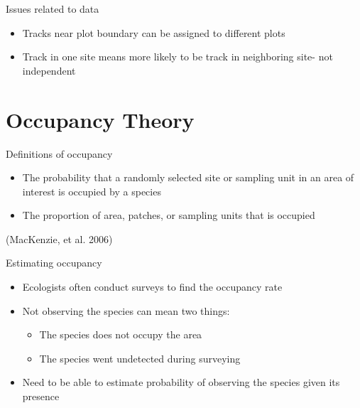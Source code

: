 \documentclass{beamer}
\begin{document}
{
	\begin{frame}
	\end{frame}
}

\begin{frame}{Issues related to data}
	\begin{itemize}
		\item Tracks near plot boundary can be assigned to different plots
		\item Track in one site means more likely to be track in neighboring site- not independent
	\end{itemize}
\end{frame}

\section{Occupancy Theory}
\begin{frame}{Definitions of occupancy}
	\begin{itemize}
		\item The probability that a randomly selected site or sampling unit in an area of interest is occupied by a species
		\item The proportion of area, patches, or sampling units that is occupied 	\end{itemize}
	(MacKenzie, et al. 2006) 
\end{frame}

\begin{frame}{Estimating occupancy}
	\begin{itemize}
		\item Ecologists often conduct surveys to find the occupancy rate
		\item Not observing the species can mean two things:
		\begin{itemize}
			\item The species does not occupy the area
			\item The species went undetected during surveying
		\end{itemize}
		\item Need to be able to estimate probability of observing the species given its presence
	\end{itemize}
\end{frame}
\end{document}
